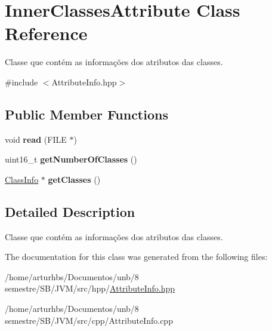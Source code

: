 \hypertarget{classInnerClassesAttribute}{}\section{Inner\+Classes\+Attribute Class Reference}
\label{classInnerClassesAttribute}


Classe que contém as informações dos atributos das classes.  




{\ttfamily \#include $<$Attribute\+Info.\+hpp$>$}

\subsection*{Public Member Functions}
\begin{DoxyCompactItemize}
\item 
void {\bfseries read} (F\+I\+LE $\ast$)\hypertarget{classInnerClassesAttribute_ae43a7123a6838f72aebd1b0a829bfb3d}{}\label{classInnerClassesAttribute_ae43a7123a6838f72aebd1b0a829bfb3d}

\item 
uint16\+\_\+t {\bfseries get\+Number\+Of\+Classes} ()\hypertarget{classInnerClassesAttribute_ad22800b6d8b252ee045c438258549570}{}\label{classInnerClassesAttribute_ad22800b6d8b252ee045c438258549570}

\item 
\hyperlink{classClassInfo}{Class\+Info} $\ast$ {\bfseries get\+Classes} ()\hypertarget{classInnerClassesAttribute_a9e5d2a9b9304e72f532ef6033dac8eea}{}\label{classInnerClassesAttribute_a9e5d2a9b9304e72f532ef6033dac8eea}

\end{DoxyCompactItemize}


\subsection{Detailed Description}
Classe que contém as informações dos atributos das classes. 

The documentation for this class was generated from the following files\+:\begin{DoxyCompactItemize}
\item 
/home/arturhbs/\+Documentos/unb/8 semestre/\+S\+B/\+J\+V\+M/src/hpp/\hyperlink{AttributeInfo_8hpp}{Attribute\+Info.\+hpp}\item 
/home/arturhbs/\+Documentos/unb/8 semestre/\+S\+B/\+J\+V\+M/src/cpp/Attribute\+Info.\+cpp\end{DoxyCompactItemize}
